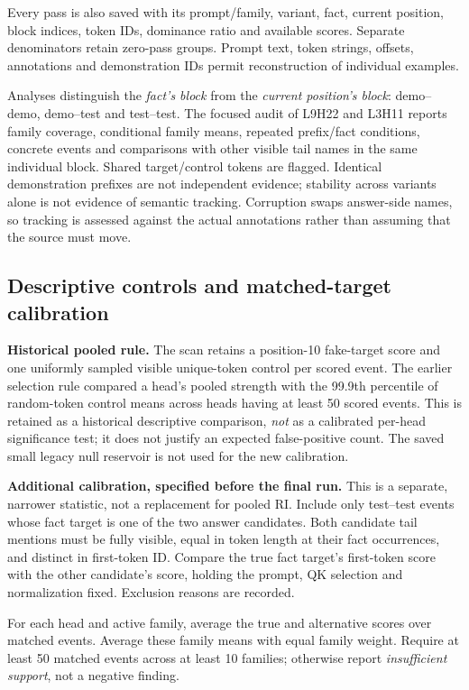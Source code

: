\documentclass[11pt,a4paper]{article}
\begin{document}
Every pass is also saved with its prompt/family, variant, fact, current position, block indices, token IDs, dominance ratio and available scores. Separate denominators retain zero-pass groups. Prompt text, token strings, offsets, annotations and demonstration IDs permit reconstruction of individual examples.

Analyses distinguish the \emph{fact's block} from the \emph{current position's block}: demo--demo, demo--test and test--test. The focused audit of L9H22 and L3H11 reports family coverage, conditional family means, repeated prefix/fact conditions, concrete events and comparisons with other visible tail names in the same individual block. Shared target/control tokens are flagged. Identical demonstration prefixes are not independent evidence; stability across variants alone is not evidence of semantic tracking. Corruption swaps answer-side names, so tracking is assessed against the actual annotations rather than assuming that the source must move.

\subsection{Descriptive controls and matched-target calibration}
\textbf{Historical pooled rule.} The scan retains a position-10 fake-target score and one uniformly sampled visible unique-token control per scored event. The earlier selection rule compared a head's pooled strength with the 99.9th percentile of random-token control means across heads having at least 50 scored events. This is retained as a historical descriptive comparison, \emph{not} as a calibrated per-head significance test; it does not justify an expected false-positive count. The saved small legacy null reservoir is not used for the new calibration.

\textbf{Additional calibration, specified before the final run.} This is a separate, narrower statistic, not a replacement for pooled RI. Include only test--test events whose fact target is one of the two answer candidates. Both candidate tail mentions must be fully visible, equal in token length at their fact occurrences, and distinct in first-token ID. Compare the true fact target's first-token score with the other candidate's score, holding the prompt, QK selection and normalization fixed. Exclusion reasons are recorded.

For each head and active family, average the true and alternative scores over matched events. Average these family means with equal family weight. Require at least 50 matched events across at least 10 families; otherwise report \emph{insufficient support}, not a negative finding.
\end{document}
